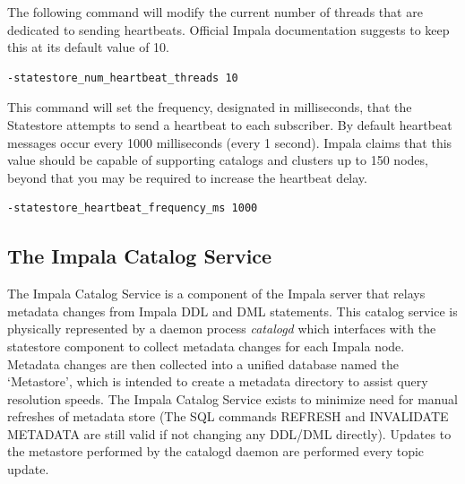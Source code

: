 \documentclass[onecolumn, draftclsnofoot,10pt, compsoc]{IEEEtran}
\begin{document}
The following command will modify the current number of threads that are dedicated to sending heartbeats. Official Impala documentation suggests to keep this at its default value of 10.
    \begin{center}
    \begin{lstlisting}[language=bash]
-statestore_num_heartbeat_threads 10
    \end{lstlisting}
    \end{center}

This command will set the frequency, designated in milliseconds, that the Statestore attempts to send a heartbeat to each subscriber. By default heartbeat messages occur every 1000 milliseconds (every 1 second). Impala claims that this value should be capable of supporting catalogs and clusters up to 150 nodes, beyond that you may be required to increase the heartbeat delay.

    \begin{center}
    \begin{lstlisting}[language=bash]
-statestore_heartbeat_frequency_ms 1000
    \end{lstlisting}
    \end{center}

    
\subsection{The Impala Catalog Service}
The Impala Catalog Service is a component of the Impala server that relays metadata changes from Impala DDL and DML statements.
This catalog service is physically represented by a daemon process \textit{catalogd} which interfaces with the statestore component to collect metadata changes for each Impala node. %
Metadata changes are then collected into a unified database named the ‘Metastore’, which is intended to create a metadata directory to assist query resolution speeds.
The Impala Catalog Service exists to minimize need for manual refreshes of metadata store (The SQL commands REFRESH and INVALIDATE METADATA are still valid if not changing any DDL/DML directly).
Updates to the metastore performed by the catalogd daemon are performed every topic update. 
\end{document}
